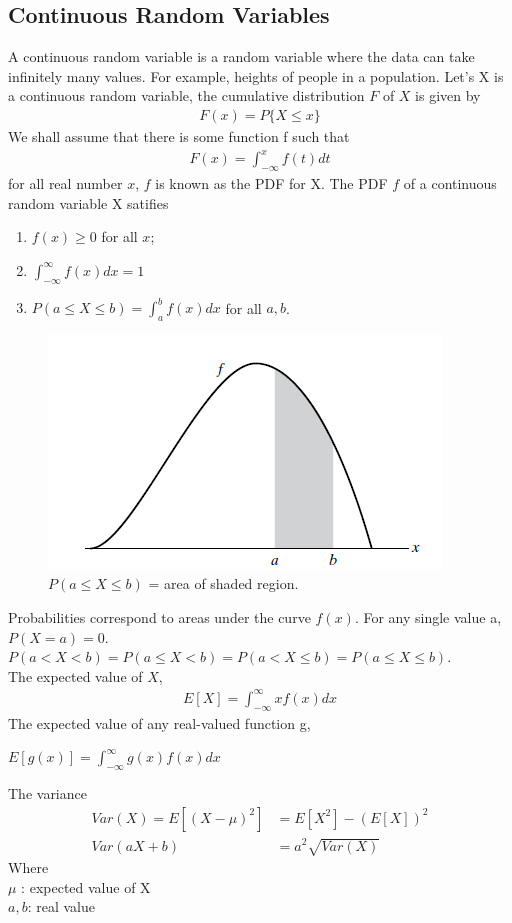 \subsection{Continuous Random Variables}
A continuous random variable is a random variable where the data can take infinitely many values. For example, heights of people in a population. Let's X is a continuous random variable, the cumulative distribution $F$ of $X$ is given by
\begin{align*}
	F(x) = P\{X\leq x\}
\end{align*}
We shall assume that there is some function f such that
\begin{align*}
		F(x) = \displaystyle \int_{-\infty}^{x}f(t)dt
\end{align*}
for all real number $x$, $f$ is known as the PDF for X. The PDF $f$ of a continuous random variable X satifies
\begin{enumerate}
	\item $f(x) \geq 0$ for all $x$;
	\item $\int_{-\infty}^{\infty}f(x)dx = 1$
	\item $P(a\leq X \leq b)=\int_{a}^{b}f(x)dx$ for all $a, b$.
\end{enumerate}
\begin{figure}[htp]
	\begin{center}
		\includegraphics[scale=0.8]{figure6}
	\end{center}
	\label{reffig6}
	\caption{$P(a\leq X \leq b)$ = area of shaded region. }
\end{figure}
Probabilities correspond to areas under the curve $f(x)$. For any single value a, $P(X=a)=0$.\\
$P(a< X < b)=P(a\leq X < b)=P(a< X \leq b)=P(a\leq X \leq b)$.\\
The expected value of $X$,
\begin{align*}
	E[X] = \displaystyle \int_{-\infty}^{\infty}xf(x)dx
\end{align*}
The expected value of any real-valued function g,
\begin{center}
	$E[g(x)] = \displaystyle \int_{-\infty}^{\infty}g(x)f(x)dx$
\end{center}
The variance
\begin{align*}
	Var(X) = E[(X - \mu)^2] &= E[X^2]-(E[X])^2\\
	Var(aX+b) &= a^2\sqrt{Var(X)}
\end{align*}
Where\\
 $\mu$ : expected value of X\\
 $a, b$: real value
 

